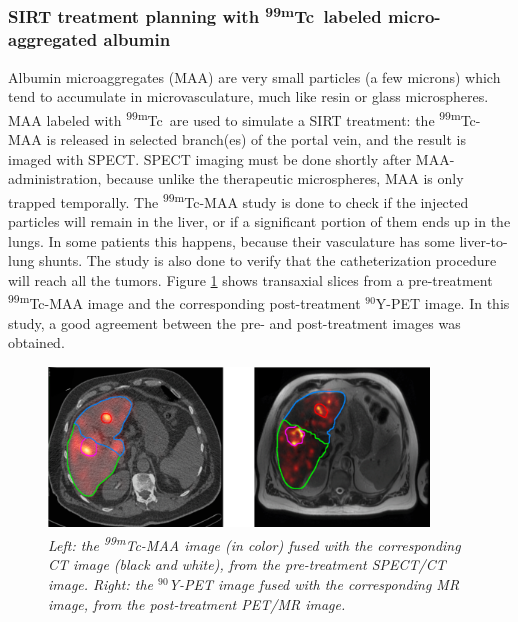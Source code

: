 \documentclass[11pt,oneside]{book}
\begin{document}
\subsubsection{SIRT treatment planning with \textsuperscript{99m}Tc\ labeled
  micro-aggregated albumin}
Albumin microaggregates (MAA) are very small particles (a few microns)
which tend to accumulate in microvasculature, much like resin or glass
microspheres. MAA labeled with \textsuperscript{99m}Tc\ are used to simulate a SIRT
treatment: the \textsuperscript{99m}Tc-MAA is released in selected branch(es) of
the portal vein, and the result is imaged with SPECT. SPECT imaging
must be done shortly after MAA-administration, because unlike the
therapeutic microspheres, MAA is only trapped temporally. The
\textsuperscript{99m}Tc-MAA study is done to check if the injected particles will
remain in the liver, or if a significant portion of them ends up in
the lungs. In some patients this happens, because their vasculature
has some liver-to-lung shunts. The study is also done to verify that
the catheterization procedure will reach all the tumors.  Figure
\ref{fig:SirtMaaY} shows transaxial slices from a pre-treatment
\textsuperscript{99m}Tc-MAA image and the corresponding post-treatment $^{90}$Y-PET
image. In this study, a good agreement between the pre- and
post-treatment images was obtained. 
%
\begin{figure}[h]
\centering
\includegraphics[width=0.9\textwidth]{figs/fig_SIRT_Tc_Y.png}
\caption{\label{fig:SirtMaaY} \emph{Left: the \textsuperscript{99m}Tc-MAA
    image (in color) fused with the corresponding CT image (black and
    white), from the pre-treatment SPECT/CT image. Right: the
    $^{90}$Y-PET image fused with the corresponding MR
    image, from the post-treatment PET/MR image.}}
\end{figure}
%
\end{document}
